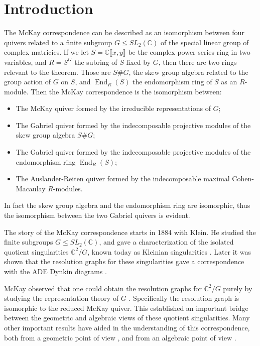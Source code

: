\documentclass[11pt, a4paper, english]{article}
\theoremstyle{definition}
\newcommand{\C}{\mathbb{C}}
\DeclareMathOperator{\End}{End}
\begin{document}
\section*{Introduction}
%
The McKay correspondence can be described as an isomorphism between four quivers related to a finite subgroup $G \leq SL_2(\C)$ of the special linear group of complex matricies. If we let $S = \C\llbracket x, y \rrbracket$ be the complex power series ring in two variables, and $R = S^G$ the subring of $S$ fixed by $G$, then there are two rings relevant to the theorem. Those are $S\#G$, the skew group algebra related to the group action of $G$ on $S$, and $\End_R(S)$ the endomorphism ring of $S$ as an $R$-module. Then the McKay correspondence is the isomorphism between:
\begin{itemize}
\item The McKay quiver formed by the irreducible representations of $G$;
\item The Gabriel quiver formed by the indecomposable projective modules of the skew group algebra $S\#G$;
\item The Gabriel quiver formed by the indecomposable projective modules of the endomorphism ring $\End_R(S)$;
\item The Auslander-Reiten quiver formed by the indecomposable maximal Cohen-Macaulay $R$-modules.
\end{itemize}
In fact the skew group algebra and the endomorphism ring are isomorphic, thus the isomorphism between the two Gabriel quivers is evident.

The story of the McKay correspondence starts in 1884 with Klein. He studied the finite subgroups $G \leq SL_2(\C)$, and gave a characterization of the isolated quotient singularities $\C^2/G$, known today as Kleinian singularities \cite{Kle84}. Later it was shown that the resolution graphs for these singularities gave a correspondence with the ADE Dynkin diagrams \cite{DuV34, Art66}.

McKay observed that one could obtain the resolution graphs for $\C^2/G$ purely by studying the representation theory of $G$ \cite{Mck83}. Specifically the resolution graph is isomorphic to the reduced McKay quiver. This established an important bridge between the geometric and algebraic views of these quotient singularities. Many other important results have aided in the understanding of this correspondence, both from a geometric point of view \cite{GSV81, AV85, EK85}, and from an algebraic point of view \cite{Aus86, AR89}.
\end{document}
